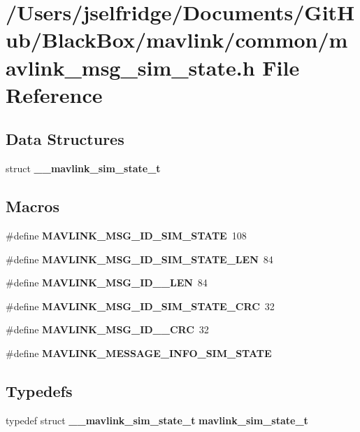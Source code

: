 \section{/\+Users/jselfridge/\+Documents/\+Git\+Hub/\+Black\+Box/mavlink/common/mavlink\+\_\+msg\+\_\+sim\+\_\+state.h File Reference}
\label{mavlink__msg__sim__state_8h}
\subsection*{Data Structures}
\begin{DoxyCompactItemize}
\item 
struct \textbf{ \+\_\+\+\_\+mavlink\+\_\+sim\+\_\+state\+\_\+t}
\end{DoxyCompactItemize}
\subsection*{Macros}
\begin{DoxyCompactItemize}
\item 
\#define \textbf{ M\+A\+V\+L\+I\+N\+K\+\_\+\+M\+S\+G\+\_\+\+I\+D\+\_\+\+S\+I\+M\+\_\+\+S\+T\+A\+TE}~108
\item 
\#define \textbf{ M\+A\+V\+L\+I\+N\+K\+\_\+\+M\+S\+G\+\_\+\+I\+D\+\_\+\+S\+I\+M\+\_\+\+S\+T\+A\+T\+E\+\_\+\+L\+EN}~84
\item 
\#define \textbf{ M\+A\+V\+L\+I\+N\+K\+\_\+\+M\+S\+G\+\_\+\+I\+D\+\_\+\_\+\+L\+EN}~84
\item 
\#define \textbf{ M\+A\+V\+L\+I\+N\+K\+\_\+\+M\+S\+G\+\_\+\+I\+D\+\_\+\+S\+I\+M\+\_\+\+S\+T\+A\+T\+E\+\_\+\+C\+RC}~32
\item 
\#define \textbf{ M\+A\+V\+L\+I\+N\+K\+\_\+\+M\+S\+G\+\_\+\+I\+D\+\_\+\_\+\+C\+RC}~32
\item 
\#define \textbf{ M\+A\+V\+L\+I\+N\+K\+\_\+\+M\+E\+S\+S\+A\+G\+E\+\_\+\+I\+N\+F\+O\+\_\+\+S\+I\+M\+\_\+\+S\+T\+A\+TE}
\end{DoxyCompactItemize}
\subsection*{Typedefs}
\begin{DoxyCompactItemize}
\item 
typedef struct \textbf{ \+\_\+\+\_\+mavlink\+\_\+sim\+\_\+state\+\_\+t} \textbf{ mavlink\+\_\+sim\+\_\+state\+\_\+t}
\end{DoxyCompactItemize}


